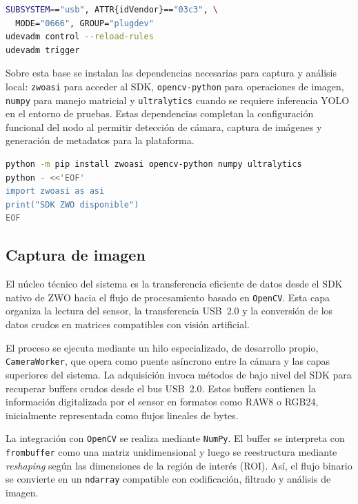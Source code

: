 \begin{lstlisting}[language=bash,basicstyle=\footnotesize\ttfamily,breaklines=true,caption={Regla \texttt{udev} mínima para cámaras ZWO ASI.},label={lst:zwo-udev}]
SUBSYSTEM=="usb", ATTR{idVendor}=="03c3", \
  MODE="0666", GROUP="plugdev"
udevadm control --reload-rules
udevadm trigger
\end{lstlisting}

Sobre esta base se instalan las dependencias necesarias para captura y análisis
local: \texttt{zwoasi} para acceder al SDK, \texttt{opencv-python} para
operaciones de imagen, \texttt{numpy} para manejo matricial y \texttt{ultralytics}
cuando se requiere inferencia YOLO en el entorno de pruebas. Estas dependencias completan la configuración funcional del nodo al permitir detección de cámara, captura de imágenes y
generación de metadatos para la plataforma.

\begin{lstlisting}[language=bash,basicstyle=\footnotesize\ttfamily,breaklines=true,caption={Instalación de dependencias de adquisición y análisis local.},label={lst:zwo-dependencias}]
python -m pip install zwoasi opencv-python numpy ultralytics
python - <<'EOF'
import zwoasi as asi
print("SDK ZWO disponible")
EOF
\end{lstlisting}

\subsection{Captura de imagen}

El núcleo técnico del sistema es la transferencia eficiente de datos desde el
SDK nativo de ZWO hacia el flujo de procesamiento basado en \texttt{OpenCV}. Esta
capa organiza la lectura del sensor, la transferencia USB~2.0 y la conversión de
los datos crudos en matrices compatibles con visión artificial.

El proceso se ejecuta mediante un hilo especializado, de desarrollo propio,
\texttt{CameraWorker}, que opera como puente asíncrono entre la cámara y las
capas superiores del sistema. La adquisición invoca métodos de bajo nivel del SDK
para recuperar buffers crudos desde el bus USB~2.0. Estos buffers contienen la
información digitalizada por el sensor en formatos como RAW8 o RGB24,
inicialmente representada como flujos lineales de bytes.

La integración con \texttt{OpenCV} se realiza mediante \texttt{NumPy}. El buffer
se interpreta con \texttt{frombuffer} como una matriz unidimensional y luego se
reestructura mediante \textit{reshaping} según las dimensiones de la región de
interés (ROI). Así, el flujo binario se convierte en un \texttt{ndarray}
compatible con codificación, filtrado y análisis de imagen.

